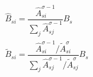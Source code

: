 \begin{gather*} \label{eq:allocation_social_planner_B}
    \hat{B}_{si} = \dfrac{\hat{A}_{si}^{\sigma -1}}{\sum_j \hat{A}_{sj}^{\sigma -1}}B_s\\ 
    \tilde{B}_{si} = \dfrac{\hat{A}_{si}^{\sigma -1}/\tilde{A}_{si}^{\sigma}}{\sum_j \hat{A}_{sj}^{\sigma -1}/ \tilde{A}_{sj}^{\sigma}}B_s
\end{gather*}